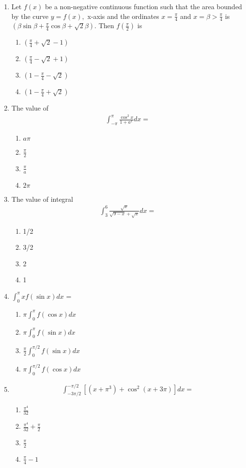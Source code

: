 \begin{enumerate}[label=\arabic*.,ref=\thesubsection.\theenumi]
\item Let $f(x)$ be a non-negative continuous function such that the area bounded by the curve $y = f(x),$ x-axis and the ordinates $x = \frac{\pi}{4}$ and $x = \beta > \frac{\pi}{4}$ is $\left(\beta\sin \beta + \frac{\pi}{4}\cos \beta + \sqrt{2}\beta\right)$. Then $f(\frac{\pi}{2})$ is
\begin{enumerate}
\item $\left(\frac{\pi}{4} + \sqrt{2} -1\right)$
\item $\left(\frac{\pi}{4} - \sqrt{2} +1\right)$
\item $\left(1 - \frac{\pi}{4} - \sqrt{2}\right)$
\item $\left(1 - \frac{\pi}{4} + \sqrt{2}\right)$
\end{enumerate} 

\item The value of
\begin{align*}
\int_{-\pi}^{\pi}\frac{\cos^{2}x}{1 + a^x}dx = 
\end{align*}
\begin{enumerate}
\item $a\pi$
\item $\frac{\pi}{2}$
\item $\frac{\pi}{a}$
\item $2\pi$
\end{enumerate}

\item The value of integral
\begin{align*}
\int_{3}^{6}\frac{\sqrt{x}}{\sqrt{9 - x} + \sqrt{x}}dx = 
\end{align*}
\begin{enumerate}
\item 1/2
\item 3/2
\item 2
\item 1
\end{enumerate}

\item $\int_{0}^{\pi}xf(\sin x)dx$ = 
\begin{enumerate}
\item $\pi\int_{0}^{\pi}f(\cos x)dx$
\item $\pi\int_{0}^{\pi}f(\sin x)dx$
\item $\frac{\pi}{2}\int_{0}^{\pi/2}f(\sin x)dx$
\item $\pi\int_{0}^{\pi/2}f(\cos x)dx$
\end{enumerate}

\item 
\begin{align*}
\int_{-3\pi/2}^{-\pi/2}[(x + \pi^3) + \cos^{2}(x + 3\pi)]dx =
\end{align*} 
\begin{enumerate}
\item $\frac{\pi^{4}}{32}$
\item $\frac{\pi^{4}}{32} + \frac{\pi}{2}$
\item $\frac{\pi}{2}$
\item $\frac{\pi}{4} - 1$
\end{enumerate}


\end{enumerate}
